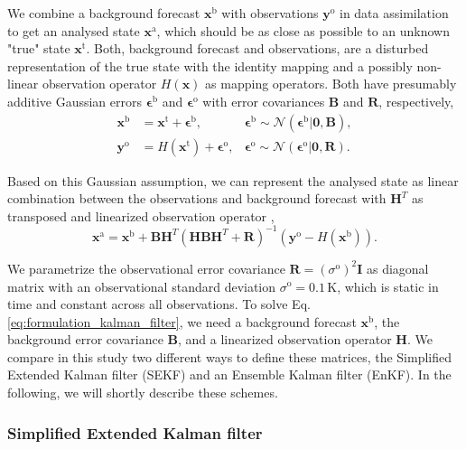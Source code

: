 \documentclass[hess, manuscript]{copernicus}
\begin{document}
We combine a background forecast $\textbf{x}^{\text{b}}$ with observations $\mathbf{y}^\text{o}$ in data assimilation to get an analysed state $\textbf{x}^{\text{a}}$, which should be as close as possible to an unknown "true" state $\textbf{x}^{\text{t}}$.
Both, background forecast and observations, are a disturbed representation of the true state with the identity mapping and a possibly non-linear observation operator $H(\mathbf{x})$ as mapping operators.
Both have presumably additive Gaussian errors $\mathbf{\epsilon}^\text{b}$ and $\mathbf{\epsilon}^\text{o}$ with error covariances $\textbf{B}$ and $\textbf{R}$, respectively,
\begin{align}
	\mathbf{x}^\text{b} &= \mathbf{x}^\text{t} + \mathbf{\epsilon}^\text{b}, & \mathbf{\epsilon}^\text{b} \sim \mathcal{N}(\mathbf{\epsilon}^\text{b} \vert \mathbf{0}, \mathbf{B}),\label{eq:formulation_kf_back}\\
	\mathbf{y}^\text{o} &= H(\mathbf{x}^\text{t}) + \mathbf{\epsilon}^\text{o}, & \mathbf{\epsilon}^\text{o} \sim \mathcal{N}(\mathbf{\epsilon}^\text{o} \vert \mathbf{0}, \mathbf{R}).
	\label{eq:formulation_kf_obsop}
\end{align}

Based on this Gaussian assumption, we can represent the analysed state as linear combination between the observations and background forecast with $\mathbf{H}^{T}$ as transposed and linearized observation operator \citep{kalman_new_1960,kalnay_atmospheric_2003},
\begin{equation}
	\mathbf{x}^\text{a} = \mathbf{x}^\text{b} + \mathbf{B}\mathbf{H}^{T}(\mathbf{H}\mathbf{B}\mathbf{H}^{T} + \mathbf{R})^{-1} (\mathbf{y}^\text{o} - H(\mathbf{x}^\text{b})).\label{eq:formulation_kalman_filter}
\end{equation}

We parametrize the observational error covariance $\mathbf{R} = (\sigma^\text{o})^2 \mathbf{I}$ as diagonal matrix with an observational standard deviation $\sigma^\text{o} = 0.1\,\text{K}$, which is static in time and constant across all observations.
To solve Eq. \eqref{eq:formulation_kalman_filter}, we need a background forecast $\mathbf{x}^\text{b}$, the background error covariance $\mathbf{B}$, and a linearized observation operator $\mathbf{H}$.
We compare in this study two different ways to define these matrices, the Simplified Extended Kalman filter (SEKF) and an Ensemble Kalman filter (EnKF).
In the following, we will shortly describe these schemes.

\subsubsection{Simplified Extended Kalman filter}
\end{document}
